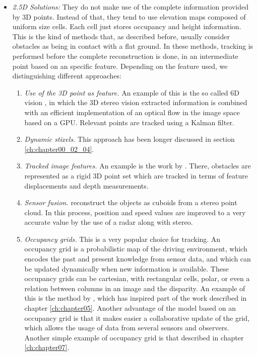 \begin{itemize}
 \item \emph{2.5D Solutions:} They do not make use of the complete information provided by 3D points. Instead of that, they tend to use elevation maps composed of uniform size cells. Each cell just stores occupancy and height information. This is the kind of methods that, as described before, usually consider obstacles as being in contact with a flat ground.
 In these methods, tracking is performed before the complete reconstruction is done, in an intermediate point based on an specific feature. Depending on the feature used, we distinguishing different approaches:
  \begin{enumerate}
   \item \emph{Use of the 3D point as feature.} An example of this is the so called 6D vision \citep{franke20056d}, in which the 3D stereo vision extracted information is combined with an efficient implementation of an optical flow in the image space based on a \ac{GPU}. Relevant points are tracked using a Kalman filter.
   \item \emph{Dynamic stixels.} This approach has been longer discussed in section \ref{ch:chapter00_02_04}.
   \item \emph{Tracked image features.} An example is the work by \cite{barth2009estimating}. There, obstacles are represented as a rigid 3D point set which are tracked in terms of feature displacements and depth measurements.
   \item \emph{Sensor fusion.} \cite{wu2009collision} reconstruct the objects as cuboids from a stereo point cloud. In this process, position and speed values are improved to a very accurate value by the use of a radar along with stereo.
   \item \emph{Occupancy grids.} This is a very popular choice for tracking. An occupancy grid is a probabilistic map of the driving environment, which encodes the past and present knowledge from sensor data, and which can be updated dynamically when new information is available. These occupancy grids can be cartesian, with rectangular cells, polar, or even a relation between columns in an image and the disparity. An example of this is the method by \cite{danescu2012particle}, which has inspired part of the work described in chapter \ref{ch:chapter05}.
   Another advantage of the model based on an occupancy grid is that it makes easier a collaborative update of the grid, which allows the usage of data from several sensors and observers. Another simple example of occupancy grid is that described in chapter \ref{ch:chapter07}.

\end{enumerate}
\end{itemize}
